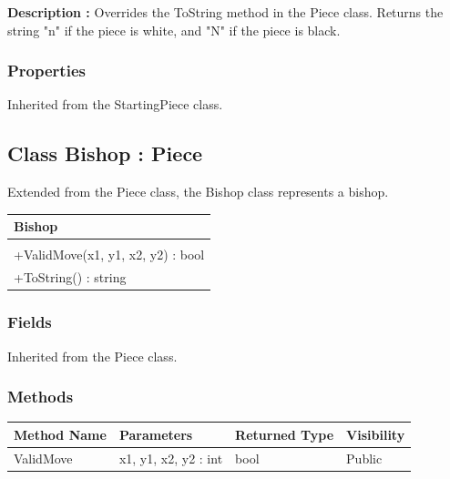 \documentclass[12pt]{article}
\begin{document}
    \textbf{Description :} Overrides the ToString method in the Piece class.
    Returns the string "n" if the piece is white, and "N" if the piece is black. 

\subsubsection{Properties}

    Inherited from the StartingPiece class.

\newpage


\subsection{Class Bishop : Piece}

    Extended from the Piece class, the Bishop class represents a bishop.
\begin{table}[H]
    \begin{tabular}{|l|}
    \hline
    \cellcolor[HTML]{C0C0C0}\textbf{Bishop} \\ \hline
    \cellcolor[HTML]{EFEFEF}                    \\ \hline
    +ValidMove(x1, y1, x2, y2) : bool           \\ \hline
    +ToString() : string                        \\ \hline
    \end{tabular}
\end{table}

\subsubsection{Fields}

    Inherited from the Piece class.

\subsubsection{Methods}

\begin{table}[H]
    \begin{tabular}{|l|l|l|l|}
    \hline
    \rowcolor[HTML]{EFEFEF} 
    \cellcolor[HTML]{EFEFEF}\textbf{Method Name} & \textbf{Parameters}  & \textbf{Returned Type} & \textbf{Visibility} \\ \hline
    ValidMove                          & x1, y1, x2, y2 : int & bool                   & Public              \\ \hline
    \end{tabular}
\end{table}
\end{document}
